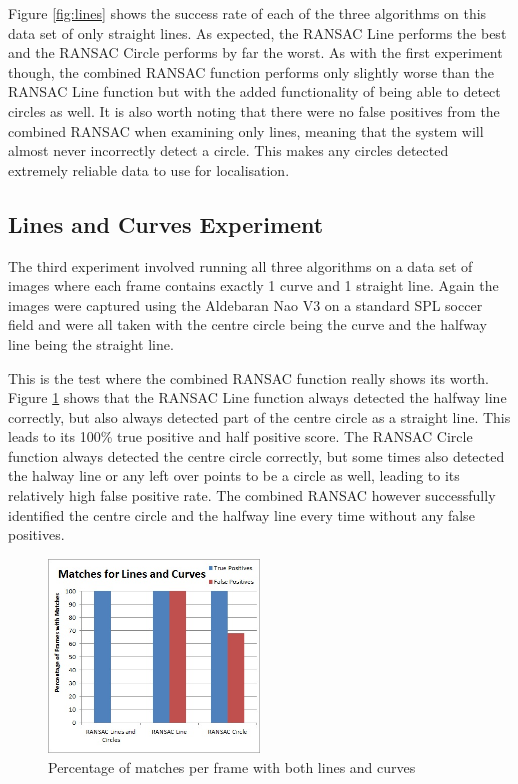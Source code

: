 \documentclass[runningheads,a4paper]{llncs}
\begin{document}
Figure \ref{fig:lines} shows the success rate of each of the three algorithms on this data set of only straight lines. As expected, the RANSAC Line performs the best and the RANSAC Circle performs by far the worst. As with the first experiment though, the combined RANSAC function performs only slightly worse than the RANSAC Line function but with the added functionality of being able to detect circles as well. It is also worth noting that there were no false positives from the combined RANSAC when examining only lines, meaning that the system will almost never incorrectly detect a circle. This makes any circles detected extremely reliable data to use for localisation.

\subsection{Lines and Curves Experiment}
The third experiment involved running all three algorithms on a data set of images where each frame contains exactly 1 curve and 1 straight line. Again the images were captured using the Aldebaran Nao V3 on a standard SPL soccer field and were all taken with the centre circle being the curve and the halfway line being the straight line.

This is the test where the combined RANSAC function really shows its worth. Figure \ref{fig:candl} shows that the RANSAC Line function always detected the halfway line correctly, but also always detected part of the centre circle as a straight line. This leads to its 100\% true positive and half positive score. The RANSAC Circle function always detected the centre circle correctly, but some times also detected the halway line or any left over points to be a circle as well, leading to its relatively high false positive rate. The combined RANSAC however successfully identified the centre circle and the halfway line every time without any false positives.

\begin{figure}[h]
\centering
\includegraphics[width=0.5\textwidth]{Pictures/candl.jpg}
\caption{Percentage of matches per frame with both lines and curves}
\label{fig:candl}
\end{figure}
\end{document}
